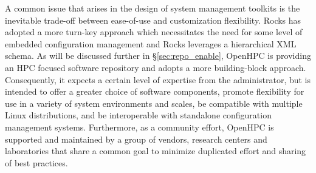 A common issue that arises in the design of system management toolkits is the
inevitable trade-off between ease-of-use and customization flexibility. Rocks
has adopted a more turn-key approach which necessitates the need for some level
of embedded configuration management and Rocks leverages a hierarchical XML
schema. As will be discussed further in \S\ref{sec:repo_enable}, OpenHPC is
providing an HPC focused software repository and adopts a more building-block
approach. Consequently, it expects a certain level of expertise from the
administrator, but is intended to offer a greater choice of software
components, promote flexibility for use in a variety of system environments
and scales, be compatible with multiple Linux distributions, and be
interoperable with standalone configuration management systems.  Furthermore, as
a community effort, OpenHPC is supported and maintained by a group of vendors,
research centers and laboratories that share a common goal to minimize
duplicated effort and sharing of best practices.

